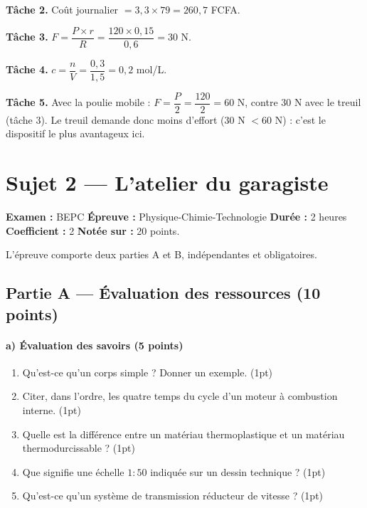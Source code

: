 \textbf{Tâche 2.} Coût journalier $=3{,}3\times79=260{,}7$ FCFA.

\textbf{Tâche 3.} $F=\dfrac{P\times r}{R}=\dfrac{120\times0{,}15}{0{,}6}=30$ N.

\textbf{Tâche 4.} $c=\dfrac nV=\dfrac{0{,}3}{1{,}5}=0{,}2$ mol/L.

\textbf{Tâche 5.} Avec la poulie mobile : $F=\dfrac P2=\dfrac{120}2=60$ N, contre $30$ N
avec le treuil (tâche 3). Le treuil demande donc moins d'effort ($30$ N $<60$ N) : c'est le
dispositif le plus avantageux ici.

\section{Sujet 2 — L'atelier du garagiste}

\noindent\textbf{Examen :} BEPC \quad\textbf{Épreuve :} Physique-Chimie-Technologie
\quad\textbf{Durée :} 2 heures \quad\textbf{Coefficient :} 2 \quad\textbf{Notée sur :}
20 points.
\par\smallskip\noindent
L'épreuve comporte deux parties A et B, indépendantes et obligatoires.

\subsection*{Partie A — Évaluation des ressources (10 points)}

\paragraph{a) Évaluation des savoirs (5 points)}
\begin{enumerate}[label=\arabic*)]
\item Qu'est-ce qu'un corps simple ? Donner un exemple. \hfill (1pt)
\item Citer, dans l'ordre, les quatre temps du cycle d'un moteur à combustion interne.
\hfill (1pt)
\item Quelle est la différence entre un matériau thermoplastique et un matériau
thermodurcissable ? \hfill (1pt)
\item Que signifie une échelle $1{:}50$ indiquée sur un dessin technique ? \hfill (1pt)
\item Qu'est-ce qu'un système de transmission réducteur de vitesse ? \hfill (1pt)
\end{enumerate}

